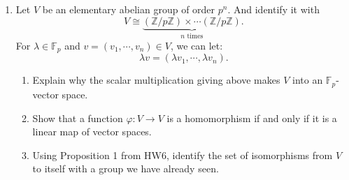\documentclass[11pt]{article}
\newcommand{\bF}{\mathbb{F}}
\newcommand{\bZ}{\mathbb{Z}}
\begin{document}
\begin{enumerate}
  \item Let $V$ be an elementary abelian group of order $p^n$.  And identify it with
  \[V\cong\underbrace{(\bZ/p\bZ)\times\cdots(\bZ/p\bZ)}_{n\text{ times}}.\]
  For $\lambda\in\bF_p$ and $v = (v_1,\cdots,v_n)\in V$, we can let:
  \[\lambda v = (\lambda v_1,\cdots,\lambda v_n).\]
  \begin{enumerate}
  \item Explain why the scalar multiplication giving above makes $V$ into an $\bF_p$-vector space.
  \item Show that a function $\varphi:V\to V$ is a homomorphism if and only if it is a linear map of vector spaces.
  \item Using Proposition 1 from HW6, identify the set of isomorphisms from $V$ to itself with a group we have already seen.
  \end{enumerate}
\end{enumerate}
\end{document}
